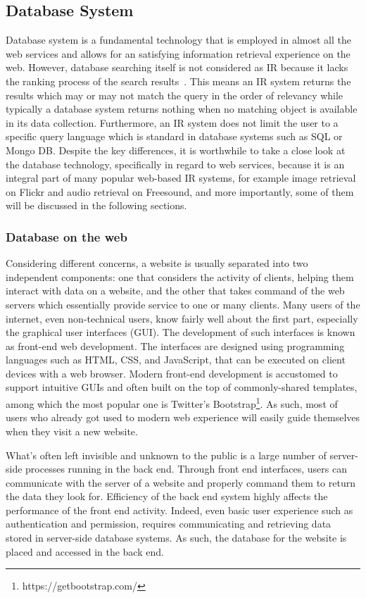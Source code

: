 \subsection{Database System}
Database system is a fundamental technology that is employed in almost all the web services and allows for an satisfying information retrieval experience on the web. However, database searching itself is not considered as IR because it lacks the ranking process of the search results~\cite{jansen2010}. This means an IR system returns the results which may or may not match the query in the order of relevancy while typically a database system returns nothing when no matching object is available in its data collection. Furthermore, an IR system does not limit the user to a specific query language which is standard in database systems such as SQL or Mongo DB.
Despite the key differences, it is worthwhile to take a close look at the database technology, specifically in regard to web services, because it is an integral part of many popular web-based IR systems, for example image retrieval on Flickr and audio retrieval on Freesound, and more importantly, some of them will be discussed in the following sections. 

\subsubsection{Database on the web}

Considering different concerns, a website is usually separated into two independent components: one that considers the activity of clients, helping them interact with data on a website, and the other that takes command of the web servers which essentially provide service to one or many clients. Many users of the internet, even non-technical users, know fairly well about the first part, especially the graphical user interfaces (GUI). The development of such interfaces is known as front-end web development. The interfaces are designed using programming languages such as HTML, CSS, and JavaScript, that can be executed on client devices with a web browser. Modern front-end development is accustomed to support intuitive GUIs and often built on the top of commonly-shared templates, among which the most popular one is Twitter's Bootstrap\footnote{https://getbootstrap.com/}. As such, most of users who already got used to modern web experience will easily guide themselves when they visit a new website.

What's often left invisible and unknown to the public is a large number of server-side processes running in the back end. Through front end interfaces, users can communicate with the server of a website and properly command them to return the data they look for. Efficiency of the back end system highly affects the performance of the front end activity. Indeed, even basic user experience such as authentication and permission, requires communicating and retrieving data stored in server-side database systems. As such, the database for the website is placed and accessed in the back end.

